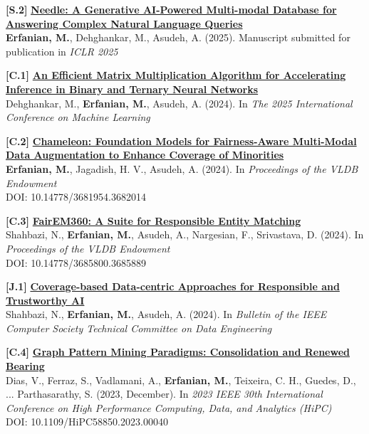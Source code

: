 \documentclass[a4paper,11pt]{article}
\begin{document}
\item[\textbf{[S.2]}] \href{https://arxiv.org/abs/2412.00639}{\textbf{Needle: A Generative AI-Powered Multi-modal Database for Answering Complex Natural Language Queries}}\\ \footnotesize{\textbf{Erfanian, M.}, Dehghankar, M., Asudeh, A. (2025).  Manuscript submitted for publication in \textit{ICLR 2025}}

\item[\textbf{[C.1]}] \href{https://arxiv.org/abs/2411.06360}{\textbf{An Efficient Matrix Multiplication Algorithm for Accelerating Inference in Binary and Ternary Neural Networks}}\\ \footnotesize{Dehghankar, M., \textbf{Erfanian, M.}, Asudeh, A. (2024). In \textit{The 2025 International Conference on Machine Learning}}

\item[\textbf{[C.2]}] \href{https://doi.org/10.14778/3681954.3682014}{\textbf{Chameleon: Foundation Models for Fairness-Aware Multi-Modal Data Augmentation to Enhance Coverage of Minorities}}\\ \footnotesize{\textbf{Erfanian, M.}, Jagadish, H. V., Asudeh, A. (2024). In \textit{Proceedings of the VLDB Endowment}}\\ {\tiny DOI: 10.14778/3681954.3682014}

\item[\textbf{[C.3]}] \href{https://www.vldb.org/pvldb/vol17/p4417-shahbazi.pdf}{\textbf{FairEM360: A Suite for Responsible Entity Matching}}\\ \footnotesize{Shahbazi, N., \textbf{Erfanian, M.}, Asudeh, A., Nargesian, F., Srivastava, D. (2024). In \textit{Proceedings of the VLDB Endowment}}\\ {\tiny DOI: 10.14778/3685800.3685889}

\item[\textbf{[J.1]}] \href{http://sites.computer.org/debull/A24mar/A24MAR-CD.pdf#page=5}{\textbf{Coverage-based Data-centric Approaches for Responsible and Trustworthy AI}}\\ \footnotesize{Shahbazi, N., \textbf{Erfanian, M.}, Asudeh, A. (2024).  In \textit{Bulletin of the IEEE Computer Society Technical Committee on Data Engineering}}

\item[\textbf{[C.4]}] \href{https://doi.org/10.1109/HiPC58850.2023.00040}{\textbf{Graph Pattern Mining Paradigms: Consolidation and Renewed Bearing}}\\ \footnotesize{Dias, V., Ferraz, S., Vadlamani, A., \textbf{Erfanian, M.}, Teixeira, C. H., Guedes, D., ... Parthasarathy, S. (2023, December). In \textit{2023 IEEE 30th International Conference on High Performance Computing, Data, and Analytics (HiPC)}}\\ \tiny{DOI: 10.1109/HiPC58850.2023.00040}
\end{document}
